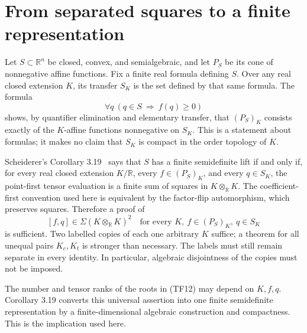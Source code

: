 \section{From separated squares to a finite representation}
Let $S\subset\mathbb R^n$ be closed, convex, and semialgebraic, and
let $P_S$ be its cone of nonnegative affine functions. Fix a finite
real formula defining $S$. Over any real closed extension $K$, its
transfer $S_K$ is the set defined by that same formula. The formula
\[
          \forall q\ (q\in S\ \Longrightarrow\ f(q)\ge0)
 \tag{TF11}
\]
shows, by quantifier elimination and elementary transfer, that
$(P_S)_K$ consists exactly of the $K$-affine functions nonnegative
on $S_K$. This is a statement about formulas; it makes no claim
that $S_K$ is compact in the order topology of $K$.

Scheiderer's Corollary 3.19~\cite{scheiderer} says that $S$ has a finite semidefinite
lift if and only if, for every real closed extension $K/\mathbb R$,
every $f\in(P_S)_K$, and every $q\in S_K$, the point-first tensor
evaluation is a finite sum of squares in $K\otimes_{\mathbb R}K$.
The coefficient-first convention used here is equivalent by the
factor-flip automorphism, which preserves squares.
Therefore a proof of
\[
       [f,q]\in\Sigma(K\otimes_{\mathbb R}K)^2
       \quad\text{for every }K,\ f\in(P_S)_K,\ q\in S_K
 \tag{TF12}
\]
is sufficient. Two labelled copies of each one arbitrary $K$ suffice;
a theorem for all unequal pairs $K_c,K_t$ is stronger than necessary.
The labels must still remain separate in every identity. In particular,
algebraic disjointness of the copies must not be imposed.

The number and tensor ranks of the roots in (TF12) may depend on
$K,f,q$. Corollary 3.19 converts this universal assertion into one
finite semidefinite representation by a finite-dimensional algebraic
construction and compactness. This is the implication used here.
